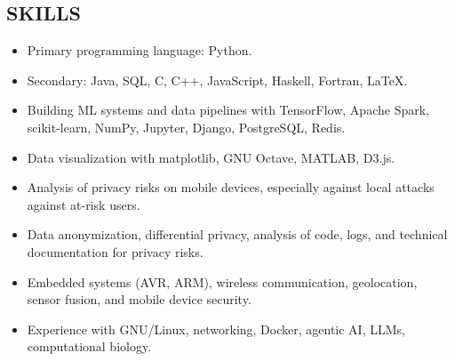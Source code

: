 \documentclass{res}
\begin{document}
\begin{resume}
\section{SKILLS}          
\begin{itemize}
	\item
		Primary programming language: Python.
	\item
		Secondary: Java, SQL, C, C++, JavaScript, Haskell, Fortran, \LaTeX{}.
	\item
		Building ML systems and data pipelines with TensorFlow, Apache Spark, scikit-learn, NumPy, Jupyter, Django, PostgreSQL, Redis.
	\item
		Data visualization with matplotlib, GNU Octave, MATLAB, D3.js.
	\item
		Analysis of privacy risks on mobile devices, especially against local attacks against at-risk users.
	\item
		Data anonymization, differential privacy, analysis of code, logs, and technical documentation for privacy risks.
	\item
		Embedded systems (AVR, ARM), wireless communication, geolocation, sensor fusion, and mobile device security.
	\item
		Experience with GNU/Linux, networking, Docker, agentic AI, LLMs, computational biology.
\end{itemize}
 



\end{resume}
\end{document}
